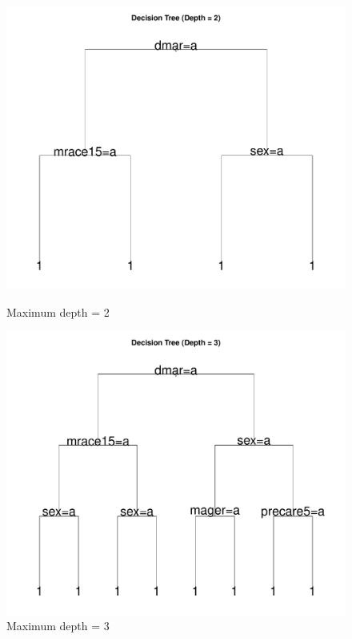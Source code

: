 \begin{figure}[p]
    \centering
    \begin{minipage}{0.48\textwidth}
        \centering
        \includegraphics[width=\linewidth]{chapters/chapter3/figures/depth/plot2/decision_tree_depth_2_2021_large.pdf}
        \caption*{Maximum depth = 2}
    \end{minipage}
    \hspace{0.02\textwidth}
    \begin{minipage}{0.48\textwidth}
        \centering
        \includegraphics[width=\linewidth]{chapters/chapter3/figures/depth/plot2/decision_tree_depth_3_2021_large.pdf}
        \caption*{Maximum depth = 3}
    \end{minipage}
    

\end{figure}
